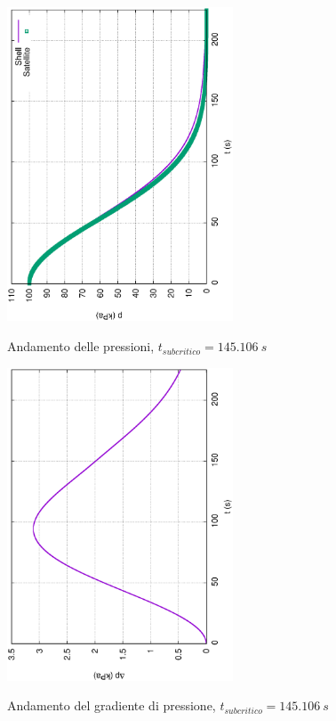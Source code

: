 \documentclass{article}
\begin{document}
        \clearpage

        \begin{figure}[h!]
            \centering
            \includegraphics[width=0.6\textwidth, angle=-90]{MUL2/Esercitazione1/2B/p.eps}
            \label{fig:press_10_6}
            \caption{Andamento delle pressioni, $t_{subcritico} = 145.106  \ s$} 
        \end{figure}

        \begin{figure}[h!]
            \centering
            \includegraphics[width=0.6\textwidth, angle=-90]{MUL2/Esercitazione1/2B/Dp.eps}
            \label{fig:grad_press_10_6}
            \caption{Andamento del gradiente di pressione, $t_{subcritico} = 145.106  \ s$}
        \end{figure}
        \clearpage
\end{document}
